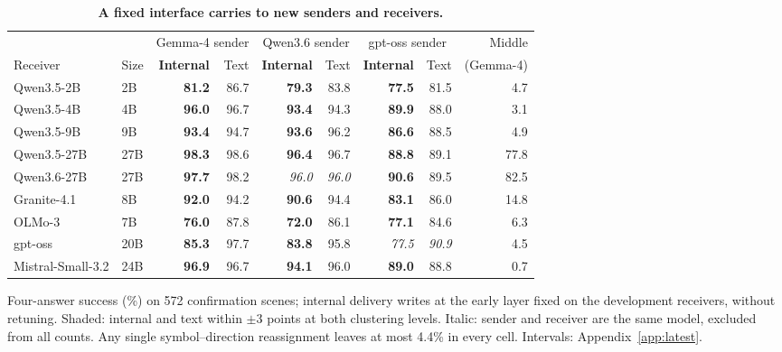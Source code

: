 \begin{table}[t]
\caption{\textbf{A fixed interface carries to new senders and receivers.}}
\label{tab:latest_main}
\centering\small
\setlength{\tabcolsep}{3.5pt}\renewcommand{\arraystretch}{1.12}
\begin{tabular*}{\linewidth}{@{\extracolsep{\fill}}llrrrrrrr@{}}
\toprule
 & & \multicolumn{2}{c}{Gemma-4 sender} & \multicolumn{2}{c}{Qwen3.6 sender} & \multicolumn{2}{c}{gpt-oss sender} & Middle \\\cmidrule(lr){3-4}\cmidrule(lr){5-6}\cmidrule(lr){7-8}
Receiver & Size & \textbf{Internal} & Text & \textbf{Internal} & Text & \textbf{Internal} & Text & (Gemma-4) \\
\midrule
Qwen3.5-2B & 2B & \textbf{81.2} & 86.7 & \textbf{79.3} & 83.8 & \textbf{77.5} & 81.5 & 4.7 \\
Qwen3.5-4B & 4B & \textbf{96.0} & 96.7 & \textbf{93.4} & 94.3 & \textbf{89.9} & 88.0 & 3.1 \\
Qwen3.5-9B & 9B & \textbf{93.4} & 94.7 & \textbf{93.6} & 96.2 & \textbf{86.6} & 88.5 & 4.9 \\
Qwen3.5-27B & 27B & \cellcolor{parity}\textbf{98.3} & \cellcolor{parity}98.6 & \cellcolor{parity}\textbf{96.4} & \cellcolor{parity}96.7 & \cellcolor{parity}\textbf{88.8} & \cellcolor{parity}89.1 & 77.8 \\
Qwen3.6-27B & 27B & \cellcolor{parity}\textbf{97.7} & \cellcolor{parity}98.2 & \textit{96.0} & \textit{96.0} & \cellcolor{parity}\textbf{90.6} & \cellcolor{parity}89.5 & 82.5 \\
\midrule
Granite-4.1 & 8B & \textbf{92.0} & 94.2 & \textbf{90.6} & 94.4 & \textbf{83.1} & 86.0 & 14.8 \\
OLMo-3 & 7B & \textbf{76.0} & 87.8 & \textbf{72.0} & 86.1 & \textbf{77.1} & 84.6 & 6.3 \\
gpt-oss & 20B & \textbf{85.3} & 97.7 & \textbf{83.8} & 95.8 & \textit{77.5} & \textit{90.9} & 4.5 \\
Mistral-Small-3.2 & 24B & \textbf{96.9} & 96.7 & \textbf{94.1} & 96.0 & \cellcolor{parity}\textbf{89.0} & \cellcolor{parity}88.8 & 0.7 \\
\bottomrule
\end{tabular*}
\par\vspace{3pt}
{\footnotesize\raggedright Four-answer success (\%) on 572 confirmation scenes; internal delivery writes at the early layer fixed on the development receivers, without retuning. Shaded: internal and text within $\pm3$ points at both clustering levels. Italic: sender and receiver are the same model, excluded from all counts. Any single symbol--direction reassignment leaves at most 4.4\% in every cell. Intervals: Appendix~\ref{app:latest}.\par}
\end{table}
